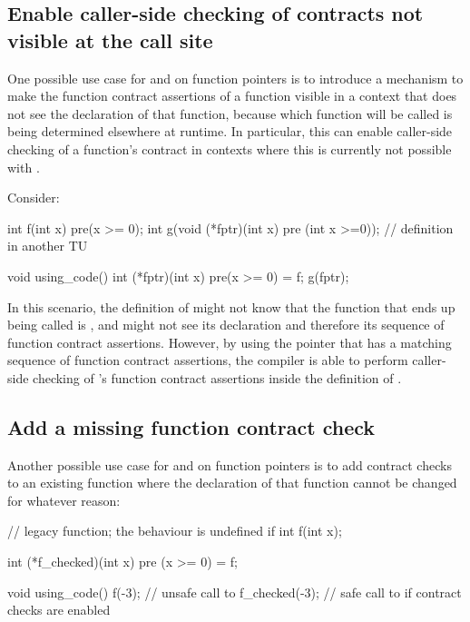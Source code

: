 \subsection{Enable caller-side checking of contracts not visible at the call site}
\label{usecase_ville}

One possible use case for  and  on function pointers is to introduce a mechanism to make the function contract assertions of a function visible in a context that does not see the declaration of that function, because which function will be called is being determined elsewhere at runtime. In particular, this can enable caller-side checking of a function's contract in contexts where this is currently not possible with \cite{P2900R8}.

Consider:
\begin{codeblock}
int f(int x) pre(x >= 0);
int g(void (*fptr)(int x) pre (int x >=0)); // definition in another TU

void using_code() {
  int (*fptr)(int x) pre(x >= 0) = f;
  g(fptr);
}
\end{codeblock}
In this scenario, the definition of  might not know that the function that ends up being called is , and might not see its declaration and therefore its sequence of function contract assertions. However, by using the pointer  that has a matching sequence of function contract assertions, the compiler is able to perform caller-side checking of 's function contract assertions inside the definition of .


\subsection{Add a missing function contract check}
\label{usecase_addmissing}

Another possible use case for  and  on function pointers is to add contract checks to an existing function where the declaration of that function cannot be changed for whatever reason:
\begin{codeblock}
// legacy function; the behaviour is undefined if 
int f(int x);   

int (*f_checked)(int x) pre (x >= 0) = f; 

void using_code() {
  f(-3);          // unsafe call to 
  f_checked(-3);  // safe call to  if contract checks are enabled
}
\end{codeblock}

